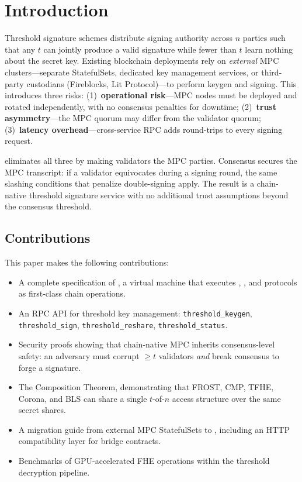 \section{Introduction}

\label{sec:introduction}

Threshold signature schemes distribute signing authority across $n$ parties such that any $t$ can jointly produce a valid signature while fewer than $t$ learn nothing about the secret key. Existing blockchain deployments rely on \emph{external} MPC clusters---separate StatefulSets, dedicated key management services, or third-party custodians (Fireblocks, Lit Protocol)---to perform keygen and signing. This introduces three risks: (1)~\textbf{operational risk}---MPC nodes must be deployed and rotated independently, with no consensus penalties for downtime; (2)~\textbf{trust asymmetry}---the MPC quorum may differ from the validator quorum; (3)~\textbf{latency overhead}---cross-service RPC adds round-trips to every signing request.

\TChain{} eliminates all three by making validators the MPC parties. Consensus secures the MPC transcript: if a validator equivocates during a signing round, the same slashing conditions that penalize double-signing apply. The result is a chain-native threshold signature service with no additional trust assumptions beyond the consensus threshold.

\subsection{Contributions}

This paper makes the following contributions:

\begin{itemize}
\item A complete specification of \ThresholdVM{}, a virtual machine that executes \FROST{}, \CGGMP{}, and \LSS{} protocols as first-class chain operations.
\item An RPC API for threshold key management: \texttt{threshold\_keygen}, \texttt{threshold\_sign}, \texttt{threshold\_reshare}, \texttt{threshold\_status}.
\item Security proofs showing that chain-native MPC inherits consensus-level safety: an adversary must corrupt $\geq t$ validators \emph{and} break consensus to forge a signature.
\item The \LSS{} Composition Theorem, demonstrating that FROST, CMP, TFHE, Corona, and BLS can share a single $t$-of-$n$ access structure over the same secret shares.
\item A migration guide from external MPC StatefulSets to \TChain{}, including an HTTP compatibility layer for bridge contracts.
\item Benchmarks of GPU-accelerated FHE operations within the threshold decryption pipeline.
\end{itemize}

